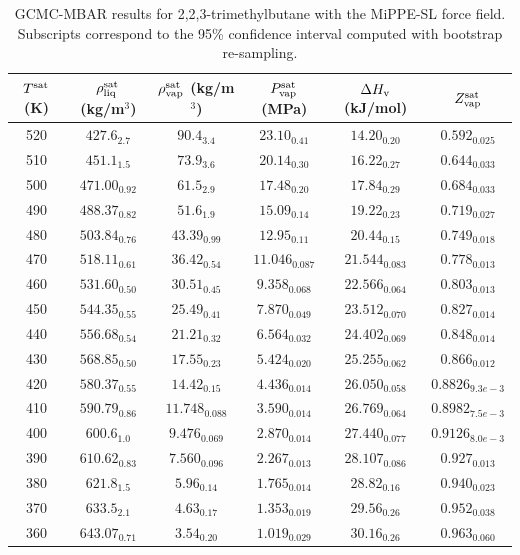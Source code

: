 \documentclass[journal=jctc,manuscript=article]{achemso}
\begin{document}
\begin{table}[htb!]
	\caption{GCMC-MBAR results for 2,2,3-trimethylbutane with the MiPPE-SL force field. Subscripts correspond to the 95\% confidence interval computed with bootstrap re-sampling.}
	\begin{center}
		\begin{tabular}{|c|c|c|c|c|c|}
			\hline
			$T^{\rm sat}$ (K) & $\rho_{\rm liq}^{\rm sat}$ (kg/m$^3$) & $\rho_{\rm vap}^{\rm sat}$ (kg/m$^3$) & $P_{\rm vap}^{\rm sat}$ (MPa) & $\Delta H_{\rm v}$ (kJ/mol) & $Z_{\rm vap}^{\rm sat}$ \\ \hline
			520 & $427.6_{2.7}$ & $90.4_{3.4}$ & $23.10_{0.41}$ & $14.20_{0.20}$ & $0.592_{0.025}$ \\
			510 & $451.1_{1.5}$ & $73.9_{3.6}$ & $20.14_{0.30}$ & $16.22_{0.27}$ & $0.644_{0.033}$ \\
			500 & $471.00_{0.92}$ & $61.5_{2.9}$ & $17.48_{0.20}$ & $17.84_{0.29}$ & $0.684_{0.033}$ \\
			490 & $488.37_{0.82}$ & $51.6_{1.9}$ & $15.09_{0.14}$ & $19.22_{0.23}$ & $0.719_{0.027}$ \\
			480 & $503.84_{0.76}$ & $43.39_{0.99}$ & $12.95_{0.11}$ & $20.44_{0.15}$ & $0.749_{0.018}$ \\
			470 & $518.11_{0.61}$ & $36.42_{0.54}$ & $11.046_{0.087}$ & $21.544_{0.083}$ & $0.778_{0.013}$ \\
			460 & $531.60_{0.50}$ & $30.51_{0.45}$ & $9.358_{0.068}$ & $22.566_{0.064}$ & $0.803_{0.013}$ \\
			450 & $544.35_{0.55}$ & $25.49_{0.41}$ & $7.870_{0.049}$ & $23.512_{0.070}$ & $0.827_{0.014}$ \\
			440 & $556.68_{0.54}$ & $21.21_{0.32}$ & $6.564_{0.032}$ & $24.402_{0.069}$ & $0.848_{0.014}$ \\
			430 & $568.85_{0.50}$ & $17.55_{0.23}$ & $5.424_{0.020}$ & $25.255_{0.062}$ & $0.866_{0.012}$ \\
			420 & $580.37_{0.55}$ & $14.42_{0.15}$ & $4.436_{0.014}$ & $26.050_{0.058}$ & $0.8826_{9.3e-3}$ \\
			410 & $590.79_{0.86}$ & $11.748_{0.088}$ & $3.590_{0.014}$ & $26.769_{0.064}$ & $0.8982_{7.5e-3}$ \\
			400 & $600.6_{1.0}$ & $9.476_{0.069}$ & $2.870_{0.014}$ & $27.440_{0.077}$ & $0.9126_{8.0e-3}$ \\
			390 & $610.62_{0.83}$ & $7.560_{0.096}$ & $2.267_{0.013}$ & $28.107_{0.086}$ & $0.927_{0.013}$ \\
			380 & $621.8_{1.5}$ & $5.96_{0.14}$ & $1.765_{0.014}$ & $28.82_{0.16}$ & $0.940_{0.023}$ \\
			370 & $633.5_{2.1}$ & $4.63_{0.17}$ & $1.353_{0.019}$ & $29.56_{0.26}$ & $0.952_{0.038}$ \\
			360 & $643.07_{0.71}$ & $3.54_{0.20}$ & $1.019_{0.029}$ & $30.16_{0.26}$ & $0.963_{0.060}$ \\
			\hline
		\end{tabular}
	\end{center}
\end{table}
\end{document}
